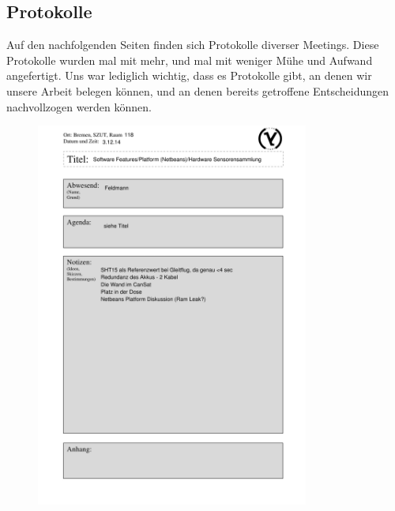 \subsection{Protokolle}
Auf den nachfolgenden Seiten finden sich Protokolle diverser Meetings. Diese Protokolle wurden mal mit mehr, und mal mit weniger Mühe und Aufwand angefertigt. Uns war lediglich wichtig, dass es Protokolle gibt, an denen wir unsere Arbeit belegen können, und an denen bereits getroffene Entscheidungen nachvollzogen werden können.
%

\newpage
%

\newpage
%

\newpage
\begin{figure}[H]
	\centering
	\includegraphics[width=0.8\textwidth]{8_Anhang/Protokolle/141203_Meeting_Protokoll.png}%
	\label{pic_protokoll_140203}
\end{figure}

\newpage
%
\newpage

